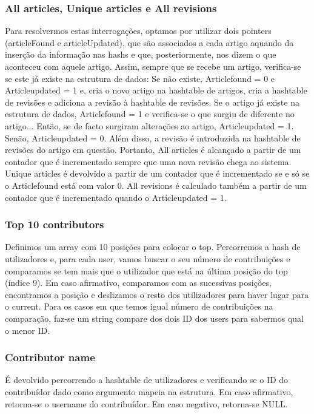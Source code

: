 \documentclass[a4paper]{article}
\begin{document}
\subsubsection{All articles, Unique articles e All revisions}
Para resolvermos estas interrogações, optamos por utilizar dois pointers (articleFound e articleUpdated), que são associados a cada artigo aquando da inserção da informação nas hashs e que, posteriormente, nos dizem o que aconteceu com aquele artigo.
Assim, sempre que se recebe um artigo, verifica-se se este já existe na estrutura de dados:
Se não existe, Articlefound = 0 e Articleupdated = 1 e, cria o novo artigo na hashtable de artigos, cria a hashtable de revisões e adiciona a revisão à hashtable de revisões.
Se o artigo já existe na estrutura de dados, Articlefound = 1 e verifica-se o que surgiu de diferente no artigo... Então, se de facto surgiram alterações ao artigo, Articleupdated = 1. Senão, Articleupdated = 0. Além disso, a revisão é introduzida na hashtable de revisões do artigo em questão.
Portanto, All articles é alcançado a partir de um contador que é incrementado sempre que uma nova revisão chega ao sistema. Unique articles é devolvido a partir de um contador que é incrementado se e só se o Articlefound está com valor 0. All revisions é calculado também a partir de um contador que é incrementado quando o Articleupdated = 1.

\subsubsection{Top 10 contributors}
Definimos um array com 10 posições para colocar o top. Percorremos a hash de utilizadores e, para cada user, vamos buscar o seu número de contribuições e comparamos se tem mais que o utilizador que está na última posição do top (índice 9). Em caso afirmativo, comparamos com as sucessivas posições, encontramos a posição e deslizamos o resto dos utilizadores para haver lugar para o current. Para os casos em que temos igual número de contribuições na comparação, faz-se um string compare dos dois ID dos users para sabermos qual o menor ID.

\subsubsection{Contributor name}
É devolvido percorrendo a hashtable de utilizadores e verificando se o ID do contribuídor dado como argumento mapeia na estrutura. Em caso afirmativo, retorna-se o username do contribuídor. Em caso negativo, retorna-se NULL.
\end{document}
